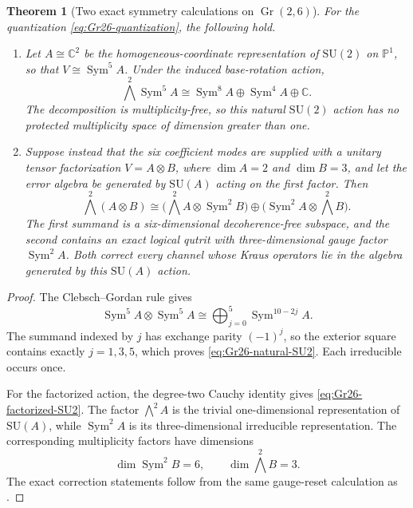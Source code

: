 \documentclass[11pt]{article}
\newtheorem{theorem}{Theorem}[section]
\theoremstyle{definition}
\theoremstyle{remark}
\newcommand{\C}{\mathbb C}
\newcommand{\Pp}{\mathbb P}
\newcommand{\Sym}{\operatorname{Sym}}
\newcommand{\Gr}{\operatorname{Gr}}
\begin{document}
\begin{theorem}[Two exact symmetry calculations on $\Gr(2,6)$]\label{thm:Gr26-codes}
For the quantization \eqref{eq:Gr26-quantization}, the following hold.
\begin{enumerate}
\item Let $A\cong\C^2$ be the homogeneous-coordinate representation of $\mathrm{SU}(2)$ on $\Pp^1$, so that $V\cong\Sym^5A$.  Under the induced base-rotation action,
\begin{equation}\label{eq:Gr26-natural-SU2}
 \bigwedge^2\Sym^5A
 \cong \Sym^8A\oplus\Sym^4A\oplus\C.
\end{equation}
The decomposition is multiplicity-free, so this natural $\mathrm{SU}(2)$ action has no protected multiplicity space of dimension greater than one.
\item Suppose instead that the six coefficient modes are supplied with a unitary tensor factorization $V=A\otimes B$, where $\dim A=2$ and $\dim B=3$, and let the error algebra be generated by $\mathrm{SU}(A)$ acting on the first factor.  Then
\begin{equation}\label{eq:Gr26-factorized-SU2}
 \bigwedge^2(A\otimes B)
 \cong
 \big(\textstyle\bigwedge^2A\otimes\Sym^2B\big)
 \oplus
 \big(\Sym^2A\otimes\textstyle\bigwedge^2B\big).
\end{equation}
The first summand is a six-dimensional decoherence-free subspace, and the second contains an exact logical qutrit with three-dimensional gauge factor $\Sym^2A$.  Both correct every channel whose Kraus operators lie in the algebra generated by this $\mathrm{SU}(A)$ action.
\end{enumerate}
\end{theorem}

\begin{proof}
The Clebsch--Gordan rule gives
\[
 \Sym^5A\otimes\Sym^5A
 \cong\bigoplus_{j=0}^{5}\Sym^{10-2j}A.
\]
The summand indexed by $j$ has exchange parity $(-1)^j$, so the exterior square contains exactly $j=1,3,5$, which proves \eqref{eq:Gr26-natural-SU2}.  Each irreducible occurs once.

For the factorized action, the degree-two Cauchy identity gives \eqref{eq:Gr26-factorized-SU2}.  The factor $\bigwedge^2A$ is the trivial one-dimensional representation of $\mathrm{SU}(A)$, while $\Sym^2A$ is its three-dimensional irreducible representation.  The corresponding multiplicity factors have dimensions
\[
 \dim\Sym^2B=6,
 \qquad
 \dim\bigwedge^2B=3.
\]
The exact correction statements follow from the same gauge-reset calculation as .
\end{proof}
\end{document}
